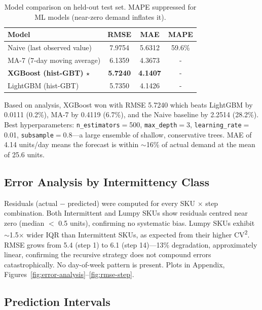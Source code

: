 \documentclass[11pt,letterpaper]{article}
\begin{document}
\begin{table}[H]
\centering
\caption{Model comparison on held-out test set. MAPE suppressed for ML models (near-zero demand inflates it).}
\label{tab:model-comparison}
\small
\begin{tabular}{@{}lccc@{}}
\toprule
\textbf{Model} & \textbf{RMSE} & \textbf{MAE} & \textbf{MAPE} \\
\midrule
Naive (last observed value) & 7.9754 & 5.6312 & 59.6\% \\
MA-7 (7-day moving average) & 6.1359 & 4.3673 & - \\
\textbf{XGBoost (hist-GBT) $\star$} & \textbf{5.7240} & \textbf{4.1407} & - \\
LightGBM (hist-GBT) & 5.7350 & 4.1426 & - \\
\bottomrule
\end{tabular}
\end{table}

Based on analysis, XGBoost won with RMSE 5.7240 which beats LightGBM by 0.0111 (0.2\%), MA-7 by 0.4119 (6.7\%), and the Naive baseline by 2.2514 (28.2\%). Best hyperparameters: \texttt{n\_estimators}$=$500, \texttt{max\_depth}$=$3, \texttt{learning\_rate}$=$0.01, \texttt{subsample}$=$0.8---a large ensemble of shallow, conservative trees. MAE of 4.14 units/day means the forecast is within $\sim$16\% of actual demand at the mean of 25.6 units.

\subsection{Error Analysis by Intermittency Class}

Residuals (actual $-$ predicted) were computed for every SKU $\times$ step combination. Both Intermittent and Lumpy SKUs show residuals centred near zero (median $<$ 0.5 units), confirming no systematic bias. Lumpy SKUs exhibit $\sim$1.5$\times$ wider IQR than Intermittent SKUs, as expected from their higher CV\textsuperscript{2}. RMSE grows from 5.4 (step 1) to 6.1 (step 14)---13\% degradation, approximately linear, confirming the recursive strategy does not compound errors catastrophically. No day-of-week pattern is present. Plots in Appendix, Figures~\ref{fig:error-analysis}--\ref{fig:rmse-step}.

\subsection{Prediction Intervals}
\label{sec:prediction-intervals}
\end{document}
